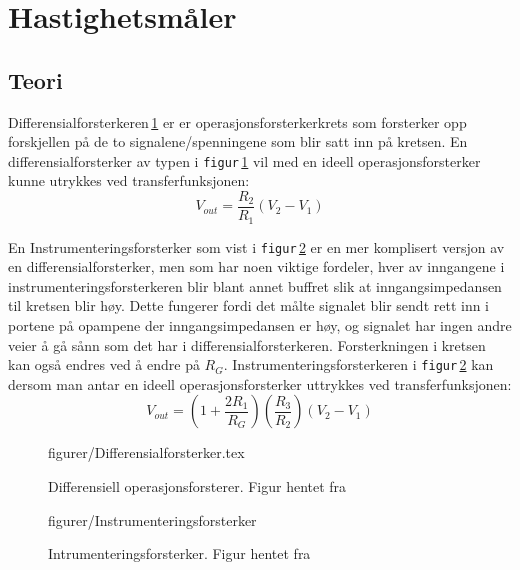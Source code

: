 



\section{Hastighetsmåler}
\subsection{Teori}
Differensialforsterkeren\,\ref{fig:differensialforsterker} er er operasjonsforsterkerkrets som forsterker opp forskjellen på de to signalene/spenningene som blir satt inn på kretsen. En differensialforsterker av typen i \texttt{figur}\,\ref{fig:differensialforsterker} vil med en ideell operasjonsforsterker kunne utrykkes ved transferfunksjonen\cite{Johnson}:
\begin{equation}
    V_{out} = \frac{R_2}{R_1}(V_2-V_1)
    \label{eq:differensialforsterker}
\end{equation}

En Instrumenteringsforsterker som vist i \texttt{figur}\,\ref{fig:instrumenteringsforsterker} er en mer komplisert versjon av en differensialforsterker, men som har noen viktige fordeler, hver av inngangene i instrumenteringsforsterkeren blir blant annet buffret slik at inngangsimpedansen til kretsen blir høy. Dette fungerer fordi det målte signalet blir sendt rett inn i portene på opampene der inngangsimpedansen er høy, og signalet har ingen andre veier å gå sånn som det har i differensialforsterkeren. Forsterkningen i kretsen kan også endres ved å endre på $R_G$. Instrumenteringsforsterkeren i \texttt{figur}\,\ref{fig:instrumenteringsforsterker} kan dersom man antar en ideell operasjonsforsterker uttrykkes ved transferfunksjonen:
\begin{equation}
    V_{out} = (1+\frac{2R_1}{R_G})(\frac{R_3}{R_2})(V_2-V_1)
    \label{eq:instrumenteringsforsterker}
\end{equation}


\begin{figure} [h]
     {figurer/Differensialforsterker.tex}
    \caption{Differensiell operasjonsforsterer. Figur hentet fra \cite{Johnson}}
    \label{fig:differensialforsterker}
\end{figure}


\begin{figure} [h]
    \centering
     {figurer/Instrumenteringsforsterker}
    \caption{Intrumenteringsforsterker. Figur hentet fra \cite{Johnson}}
    \label{fig:instrumenteringsforsterker}
\end{figure}



